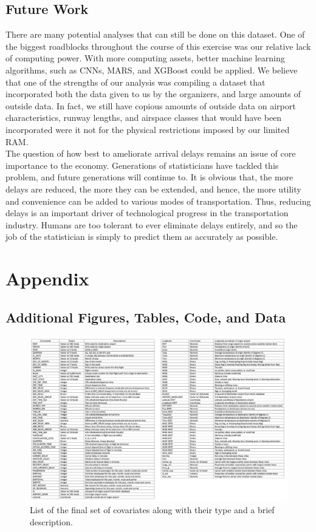 \documentclass[12pt, a4paper, openany]{book}
\newcommand\tab[1][1cm]{\hspace*{#1}}
\begin{document}
	\section{Future Work}
	\tab There are many potential analyses that can still be done on this dataset. One of the biggest roadblocks throughout the course of this exercise was our relative lack of computing power. With more computing assets, better machine learning algorithms, such as CNNs, MARS, and XGBoost could be applied. We believe that one of the strengths of our analysis was compiling a dataset that incorporated both the data given to us by the organizers, and large amounts of outside data. In fact, we still have copious amounts of outside data on airport characteristics, runway lengths, and airspace classes that would have been incorporated were it not for the physical restrictions imposed by our limited RAM. \\
	\tab The question of how best to ameliorate arrival delays remains an issue of core importance to the economy. Generations of statisticians have tackled this problem, and future generations will continue to. It is obvious that, the more delays are reduced, the more they can be extended, and hence, the more utility and convenience can be added to various modes of transportation. Thus, reducing delays is an important driver of technological progress in the transportation industry. Humans are too tolerant to ever eliminate delays entirely, and so the job of the statistician is simply to predict them as accurately as possible. 
\chapter{Appendix}
	\section{Additional Figures, Tables, Code, and Data}
			\begin{figure}[h]
			\centering
	 		\includegraphics[width = 1 \textwidth]{../figures/PLOTS FOR REPORT/Covariate List}
	 		\caption{List of the final set of covariates along with their type and a brief description.}
	 		\end{figure}
\end{document}
